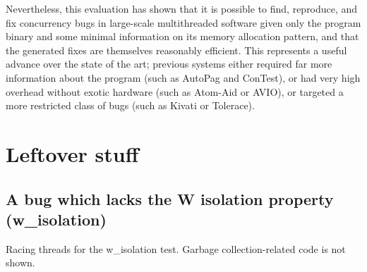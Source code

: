 Nevertheless, this evaluation has shown that it is possible to find,
reproduce, and fix concurrency bugs in large-scale multithreaded
software given only the program binary and some minimal information on
its memory allocation pattern, and that the generated fixes are
themselves reasonably efficient.  This represents a useful advance
over the state of the art; previous systems either required far more
information about the program (such as AutoPag\needCite{} and
ConTest\needCite{}), or had very high overhead without exotic hardware
(such as Atom-Aid\needCite{} or AVIO\needCite{}), or targeted a more
restricted class of bugs (such as Kivati\needCite{} or
Tolerace\needCite{}).

\section{Leftover stuff}

\subsection{A bug which lacks the W isolation property (w\_isolation)}

\begin{sanefig}
  \centerline{
    {\hfill}
    {\hfill}
    {\hfill}
  }
  \caption{Racing threads for the w\_isolation test.  Garbage
    collection-related code is not shown.}
  \label{fig:w_isolation}
\end{sanefig}


